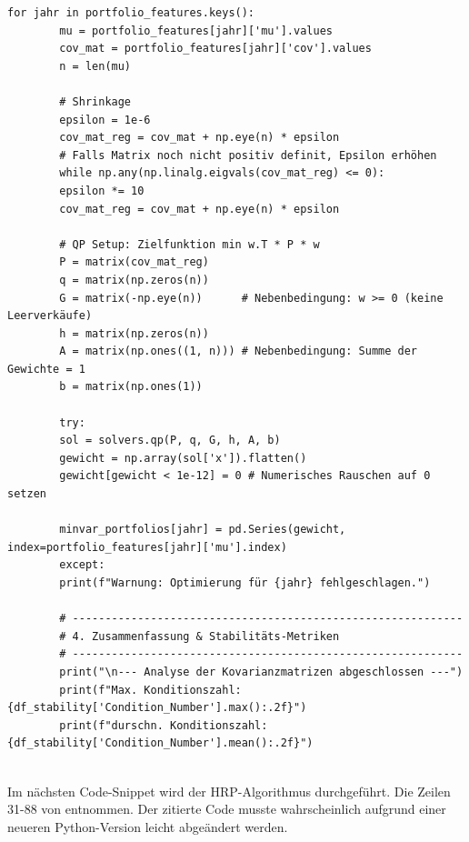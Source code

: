 \documentclass[parskip=half]{scrartcl}
\begin{document}
\begin{lstlisting}[caption={Markowitz-Optimierung}, label={lst:mark_code}]
		for jahr in portfolio_features.keys(): 
		mu = portfolio_features[jahr]['mu'].values 
		cov_mat = portfolio_features[jahr]['cov'].values 
		n = len(mu) 
		
		# Shrinkage
		epsilon = 1e-6 
		cov_mat_reg = cov_mat + np.eye(n) * epsilon 
		# Falls Matrix noch nicht positiv definit, Epsilon erhöhen
		while np.any(np.linalg.eigvals(cov_mat_reg) <= 0): 
		epsilon *= 10 
		cov_mat_reg = cov_mat + np.eye(n) * epsilon 
		
		# QP Setup: Zielfunktion min w.T * P * w 
		P = matrix(cov_mat_reg) 
		q = matrix(np.zeros(n)) 
		G = matrix(-np.eye(n))      # Nebenbedingung: w >= 0 (keine Leerverkäufe)
		h = matrix(np.zeros(n)) 
		A = matrix(np.ones((1, n))) # Nebenbedingung: Summe der Gewichte = 1 
		b = matrix(np.ones(1)) 
		
		try:
		sol = solvers.qp(P, q, G, h, A, b) 
		gewicht = np.array(sol['x']).flatten() 
		gewicht[gewicht < 1e-12] = 0 # Numerisches Rauschen auf 0 setzen
		
		minvar_portfolios[jahr] = pd.Series(gewicht, index=portfolio_features[jahr]['mu'].index) 
		except:
		print(f"Warnung: Optimierung für {jahr} fehlgeschlagen.")
		
		# ------------------------------------------------------------ 
		# 4. Zusammenfassung & Stabilitäts-Metriken
		# ------------------------------------------------------------ 
		print("\n--- Analyse der Kovarianzmatrizen abgeschlossen ---") 
		print(f"Max. Konditionszahl: {df_stability['Condition_Number'].max():.2f}") 
		print(f"durschn. Konditionszahl:    {df_stability['Condition_Number'].mean():.2f}")
		
	\end{lstlisting}
	
	Im nächsten Code-Snippet wird der HRP-Algorithmus durchgeführt. Die Zeilen 31-88 von \textcite[229-231]{Lopez} entnommen. Der zitierte Code musste wahrscheinlich aufgrund einer neueren Python-Version leicht abgeändert werden.
	
	\clearpage
	
\end{document}
